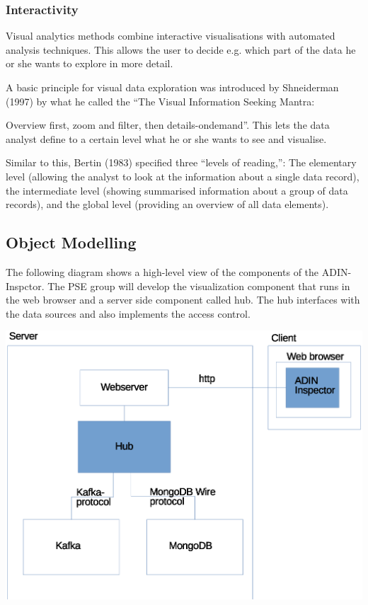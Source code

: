 \documentclass[twoside, english, draft]{Pflichtenheft}
\begin{document}
\subsubsection{Interactivity}

Visual analytics methods combine interactive visualisations with automated analysis
techniques. This allows the user to decide e.g. which part
of the data he or she wants to explore in more detail.

A basic principle for visual data exploration was introduced by Shneiderman (1997) by what he called the “The Visual Information Seeking Mantra:

Overview first, zoom and filter, then details-ondemand”.
This lets the data analyst define to a certain level what he or she wants
to see and visualise.

Similar to this, Bertin (1983) specified three “levels of reading,”:
The elementary level (allowing the analyst to look at the information about a
single data record), the intermediate level (showing summarised information about a group of data records), and the global level (providing an overview of all data elements).

\subsection{Object Modelling}

The following diagram shows a high-level view of the components of the ADIN-Inspctor. The PSE group will develop the visualization component that runs in the web browser and a server side component called hub. The hub interfaces with the data sources and also implements the access control.

\begin{center}
\includegraphics[scale=0.8]{Images/adin-sys1d.eps}
\label{fig:adinsys1c}
\end{center}
\end{document}
